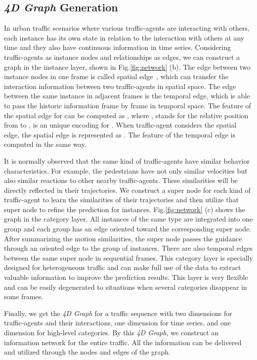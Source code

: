 \documentclass[letterpaper]{article} \usepackage{aaai19}  \usepackage{times}  \usepackage{helvet}  \usepackage{courier}  \usepackage{url}  \usepackage{graphicx}  \usepackage{amsmath}
\begin{document}
\subsection{\textit{4D Graph} Generation}
In urban traffic scenarios where various traffic-agents are interacting with others, each instance has its own state in relation to the interaction with others at any time and they also have continuous information in time series. Considering traffic-agents as instance nodes and relationships as edges, we can construct a graph in the instance layer, shown in Fig.\ref{fig:network} (b). The edge between two instance nodes in one frame is called spatial edge~\cite{jain2016structural,vemula2017social}, which can transfer the interaction information between two traffic-agents in spatial space. The edge between the same instance in adjacent frames is the temporal edge, which is able to pass the historic information frame by frame in temporal space. The feature of the spatial edge  for  can be computed as , where ,  stands for the relative position from  to ,  is an unique encoding for . When traffic-agent  considers the spatial edge, the spatial edge is represented as . The feature of the temporal edge  is computed in the same way. 

It is normally observed that the same kind of traffic-agents have similar behavior characteristics. For example, the pedestrians have not only similar velocities but also similar reactions to other nearby traffic-agents. These similarities will be directly reflected in their trajectories. We construct a super node  for each kind of traffic-agent to learn the similarities of their trajectories and then utilize that super node to refine the prediction for instances. Fig.\ref{fig:network} (c) shows the graph in the category layer. All instances of the same type are integrated into one group and each group has an edge oriented toward the corresponding super node. After summarizing the motion similarities, the super node passes the guidance through an oriented edge to the group of instances. There are also temporal edges between the same super node in sequential frames. This category layer is specially designed for heterogeneous traffic and can make full use of the data to extract valuable information to improve the prediction results. This layer is very flexible and can be easily degenerated to situations when several categories disappear in some frames.

Finally, we get the \textit{4D Graph} for a traffic sequence with two dimensions for traffic-agents and their interactions, one dimension for time series, and one dimension for high-level categories. By this \textit{4D Graph}, we construct an information network for the entire traffic. All the information can be delivered and utilized through the nodes and edges of the graph.
\end{document}
